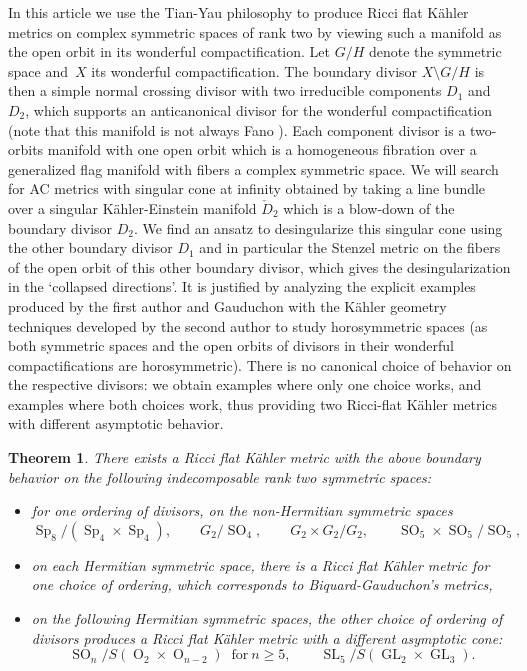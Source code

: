 \documentclass[10pt]{amsart}
\DeclareMathOperator{\rO}{O}
\theoremstyle{plain}
\newtheorem{thm}{Theorem}[section]
\theoremstyle{definition}
\DeclareMathOperator{\SL}{SL}
\DeclareMathOperator{\Sp}{Sp}
\DeclareMathOperator{\SO}{SO}
\DeclareMathOperator{\GL}{GL}
\begin{document}
In this article we use the Tian-Yau philosophy to produce Ricci flat
Kähler metrics on complex symmetric spaces of rank two by viewing such
a manifold as the open orbit in its wonderful compactification.
Let $G/H$ denote the symmetric space and~$X$ its wonderful compactification.
The boundary divisor $X\setminus G/H$ is then a simple normal crossing divisor
with two irreducible components $D_1$ and $D_2$, which supports an anticanonical
divisor for the wonderful compactification (note that this manifold is not always
Fano \cite{Ruz12}). Each component divisor is a two-orbits manifold
with one open orbit which is a homogeneous fibration over a
generalized flag manifold with fibers a complex symmetric space. We
will search for AC metrics with singular cone at infinity obtained by
taking a line bundle over a singular Kähler-Einstein manifold $\check{D}_2$ which is
a blow-down of the boundary divisor $D_2$. We find an ansatz to
desingularize this singular cone using the other boundary divisor $D_1$ and
in particular the Stenzel metric on the fibers of the open orbit of
this other boundary divisor, which gives the desingularization in the
`collapsed directions'. It is justified by analyzing the explicit
examples produced by the first author and Gauduchon with the Kähler
geometry techniques developed by the second author to study
horosymmetric spaces \cite{DelHoro} (as both symmetric spaces and the
open orbits of divisors in their wonderful compactifications are
horosymmetric). There is no canonical choice of behavior on the
respective divisors: we obtain examples where only one choice works,
and examples where both choices work, thus providing two Ricci-flat
Kähler metrics with different asymptotic behavior.


\begin{thm}
There exists a Ricci flat Kähler metric with the above boundary behavior on the following
indecomposable rank two symmetric spaces:
\begin{itemize}
\item for one ordering of divisors, on the non-Hermitian symmetric spaces
\[ \Sp_8/(\Sp_4\times \Sp_4), \qquad G_2/\SO_4, \qquad G_2\times G_2/G_2, \qquad \SO_5\times \SO_5/\SO_5, \]
\item on each Hermitian symmetric space, there is a Ricci flat Kähler metric for one choice
of ordering, which corresponds to Biquard-Gauduchon's metrics,
\item on the following Hermitian symmetric spaces, the other choice of ordering of divisors produces a
Ricci flat Kähler metric with a different asymptotic cone:
\[ \SO_n/S(\rO_2\times \rO_{n-2})~\text{ for}~n\geq 5, \qquad
\SL_5/S(\GL_2\times \GL_3). \]
\end{itemize}
\end{thm}
\end{document}
